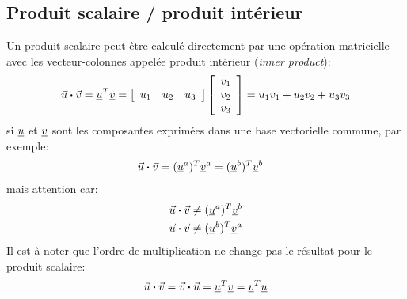 \subsection{Produit scalaire / produit intérieur}
Un produit scalaire peut être calculé directement par une opération matricielle avec les vecteur-colonnes appelée produit intérieur (\textit{inner product}):
\begin{equation}
\vec{u} \boldsymbol{\cdot} \vec{v} = \underline{u}^T \underline{v} = \left[ \begin{array}{c c c} u_1 & u_2 & u_3  \end{array} \right]  \left[ \begin{array}{c} v_1 \\ v_2 \\ v_3  \end{array} \right]
= u_1 v_1 + u_2 v_2 + u_3 v_3
\end{equation} 
si $\underline{u}$ et $\underline{v}$ sont les composantes exprimées dans une base vectorielle commune, par exemple:
\begin{align}
\vec{u} \boldsymbol{\cdot} \vec{v} &= (\underline{u}^a)^T \underline{v}^a = (\underline{u}^b)^T \underline{v}^b
\end{align} 
mais attention car: 
\begin{align}
\vec{u} \boldsymbol{\cdot} \vec{v} &\ne (\underline{u}^a)^T \underline{v}^b \\
\vec{u} \boldsymbol{\cdot} \vec{v} &\ne (\underline{u}^b)^T \underline{v}^a 
\end{align} 
Il est à noter que l'ordre de multiplication ne change pas le résultat pour le produit scalaire:
\begin{equation}
\vec{u} \boldsymbol{\cdot} \vec{v} = \vec{v} \boldsymbol{\cdot} \vec{u} = \underline{u}^T \underline{v} = \underline{v}^T \underline{u} 
\end{equation} 


